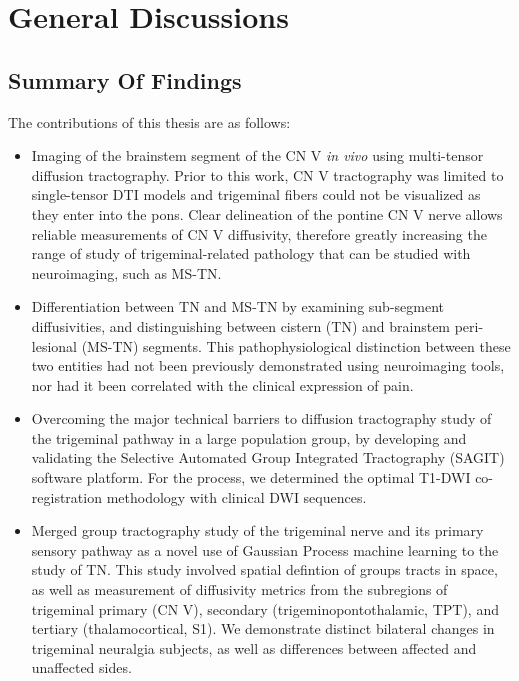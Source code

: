 \graphicspath{{images/discussions/}}

\chapter{General Discussions}

\section{Summary Of Findings}

The contributions of this thesis are as follows:

\begin{itemize}

\item Imaging of the brainstem segment of the CN V \textit{in vivo} using multi-tensor diffusion tractography. Prior to this work, CN V tractography was limited to single-tensor DTI models and trigeminal fibers could not be visualized as they enter into the pons. Clear delineation of the pontine CN V nerve allows reliable measurements of CN V diffusivity, therefore greatly increasing the range of study of trigeminal-related pathology that can be studied with neuroimaging, such as MS-TN. 

\item Differentiation between TN and MS-TN by examining sub-segment diffusivities, and distinguishing between cistern (TN) and brainstem peri-lesional (MS-TN) segments. This pathophysiological distinction between these two entities had not been previously demonstrated using neuroimaging tools, nor had it been correlated with the clinical expression of pain. 

\item Overcoming the major technical barriers to diffusion tractography study of the trigeminal pathway in a large population group, by developing and validating the Selective Automated Group Integrated Tractography (SAGIT) software platform. For the process, we determined the optimal T1-DWI co-registration methodology with clinical DWI sequences.

\item Merged group tractography study of the trigeminal nerve and its primary sensory pathway as a novel use of Gaussian Process machine learning to the study of TN. This study involved spatial defintion of groups tracts in space, as well as measurement of diffusivity metrics from the subregions of trigeminal primary (CN V), secondary (trigeminopontothalamic, TPT), and tertiary (thalamocortical, S1). We demonstrate distinct bilateral changes in trigeminal neuralgia subjects, as well as differences between affected and unaffected sides. 

\end{itemize}

